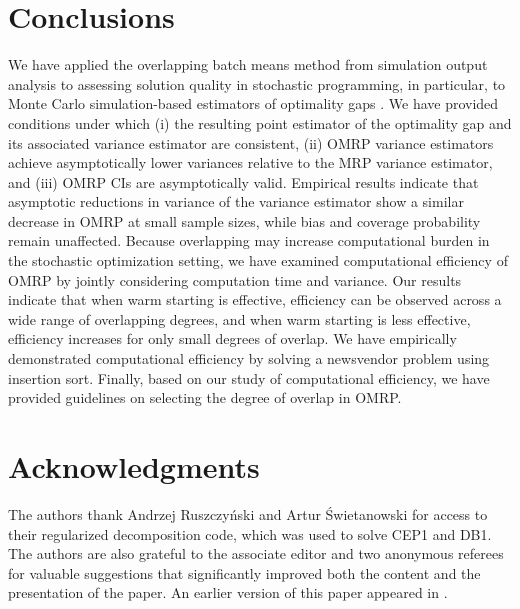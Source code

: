\documentclass[12pt]{article}
\begin{document}
\section{Conclusions}
\label{sec:concl}

We have applied the overlapping batch means method from simulation output analysis \citep{Meketon1984,Song1992,Welch1987} to assessing solution quality in stochastic programming, in particular, to Monte Carlo simulation-based estimators of optimality gaps \citep{Mak1999}. 
We have provided conditions under which (i) the resulting point estimator of the optimality gap and its associated variance estimator are consistent, (ii) OMRP variance estimators achieve asymptotically lower variances relative to the MRP variance estimator, and (iii) OMRP CIs are asymptotically valid. 
Empirical results indicate that asymptotic reductions in variance of the variance estimator show a similar decrease in OMRP at small sample sizes, while bias and coverage probability remain unaffected. 
Because overlapping may increase computational burden in the stochastic optimization setting, we have examined computational efficiency of OMRP by jointly considering computation time and variance. 
Our results indicate that when warm starting is effective, efficiency can be observed across a wide range of overlapping degrees, and when warm starting is less effective, efficiency increases for only small degrees of overlap. 
We have empirically demonstrated computational efficiency by solving a newsvendor problem using insertion sort.
Finally, based on our study of computational efficiency, we have provided guidelines on selecting the degree of overlap in OMRP. 

 

\section*{Acknowledgments}
The authors thank Andrzej Ruszczy{\'{n}}ski and Artur {\'{S}}wietanowski for
access to their regularized decomposition code, which was used to solve CEP1 and DB1. 
The authors are also grateful to the associate editor and two anonymous referees for valuable suggestions that significantly improved both the content and the presentation of the paper. 
An earlier version of this paper appeared in \citep{love2011overlapping}.



\end{document}
